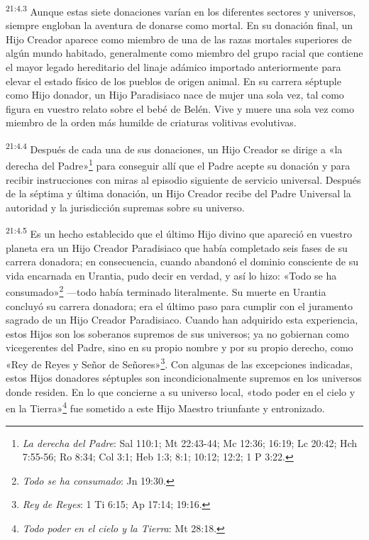 \par
\textsuperscript{21:4.3} Aunque estas siete donaciones varían en los diferentes sectores y universos, siempre engloban la aventura de donarse como mortal. En su donación final, un Hijo Creador aparece como miembro de una de las razas mortales superiores de algún mundo habitado, generalmente como miembro del grupo racial que contiene el mayor legado hereditario del linaje adámico importado anteriormente para elevar el estado físico de los pueblos de origen animal. En su carrera séptuple como Hijo donador, un Hijo Paradisiaco nace de mujer una sola vez, tal como figura en vuestro relato sobre el bebé de Belén. Vive y muere una sola vez como miembro de la orden más humilde de criaturas volitivas evolutivas.

\par
\textsuperscript{21:4.4} Después de cada una de sus donaciones, un Hijo Creador se dirige a «la derecha del Padre»\footnote{\textit{La derecha del Padre}: Sal 110:1; Mt 22:43-44; Mc 12:36; 16:19; Lc 20:42; Hch 7:55-56; Ro 8:34; Col 3:1; Heb 1:3; 8:1; 10:12; 12:2; 1 P 3:22.} para conseguir allí que el Padre acepte su donación y para recibir instrucciones con miras al episodio siguiente de servicio universal. Después de la séptima y última donación, un Hijo Creador recibe del Padre Universal la autoridad y la jurisdicción supremas sobre su universo.

\par
\textsuperscript{21:4.5} Es un hecho establecido que el último Hijo divino que apareció en vuestro planeta era un Hijo Creador Paradisiaco que había completado seis fases de su carrera donadora; en consecuencia, cuando abandonó el dominio consciente de su vida encarnada en Urantia, pudo decir en verdad, y así lo hizo: «Todo se ha consumado»\footnote{\textit{Todo se ha consumado}: Jn 19:30.} ---todo había terminado literalmente. Su muerte en Urantia concluyó su carrera donadora; era el último paso para cumplir con el juramento sagrado de un Hijo Creador Paradisiaco. Cuando han adquirido esta experiencia, estos Hijos son los soberanos supremos de sus universos; ya no gobiernan como vicegerentes del Padre, sino en su propio nombre y por su propio derecho, como «Rey de Reyes y Señor de Señores»\footnote{\textit{Rey de Reyes}: 1 Ti 6:15; Ap 17:14; 19:16.}. Con algunas de las excepciones indicadas, estos Hijos donadores séptuples son incondicionalmente supremos en los universos donde residen. En lo que concierne a su universo local, «todo poder en el cielo y en la Tierra»\footnote{\textit{Todo poder en el cielo y la Tierra}: Mt 28:18.} fue sometido a este Hijo Maestro triunfante y entronizado.


